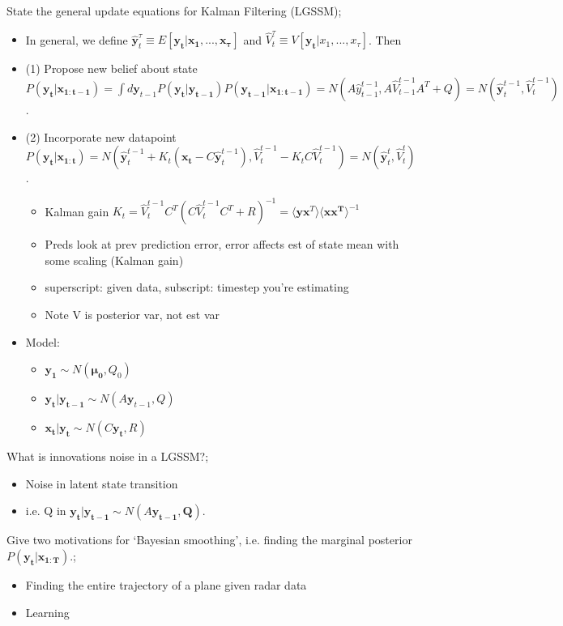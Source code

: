 \documentclass{article}
\begin{document}
State the general update equations for Kalman Filtering (LGSSM); \begin{itemize} \item In general, we define $\hat{\mathbf{y}}^\tau_t \equiv E[\mathbf{y_t|x_1,...,x_\tau}]$ and $\hat{V}^\tau_t \equiv V[\mathbf{y_t}|x_1,...,x_\tau]$. Then \item (1) Propose new belief about state $P(\mathbf{y_t|x_{1:t-1}})=\int d\mathbf{y}_{t-1}P(\mathbf{y_t|y_{t-1}})P(\mathbf{y_{t-1}|x_{1:t-1}})=N(A\hat{y}^{t-1}_{t-1}, A\hat{V}^{t-1}_{t-1}A^T+Q)=N(\hat{\mathbf{y}}^{t-1}_t, \hat{V}^{t-1}_t)$. \item (2) Incorporate new datapoint $P(\mathbf{y_t|x_{1:t}})=N(\hat{\mathbf{y}}^{t-1}_t+K_t(\mathbf{x_t}-C\mathbf{\hat{y}}^{t-1}_t), \hat{V}^{t-1}_t - K_tC\hat{V}^{t-1}_t)=N(\mathbf{\hat{y}}^t_t, \hat{V}^t_t)$. \begin{itemize} \item Kalman gain $K_t = \hat{V}^{t-1}_tC^T(C\hat{V}^{t-1}_tC^T+R)^{-1} = \langle \mathbf{yx}^T \rangle \langle \mathbf{xx^T} \rangle^{-1}$ \item Preds look at prev prediction error, error affects est of state mean with some scaling (Kalman gain) \end{itemize} \begin{itemize} \item superscript: given data, subscript: timestep you're estimating \item Note V is posterior var, not est var \end{itemize} \item Model: \begin{itemize} \item $\mathbf{y_1}\sim N(\mathbf{\mu_0},Q_0)$ \item $\mathbf{y_t|y_{t-1}}\sim N(A\mathbf{y}_{t-1}, Q)$ \item $\mathbf{x_t|y_t}\sim N(C\mathbf{y_t},R)$ \end{itemize} \end{itemize}

What is innovations noise in a LGSSM?; \begin{itemize} \item Noise in latent state transition \item i.e. Q in $\mathbf{y_t|y_{t-1}}\sim N(A\mathbf{y_{t-1}, Q})$. \end{itemize}

Give two motivations for `Bayesian smoothing', i.e. finding the marginal posterior $P(\mathbf{y_t|x_{1:T}})$.; \begin{itemize} \item Finding the entire trajectory of a plane given radar data \item Learning \end{itemize}
\end{document}

